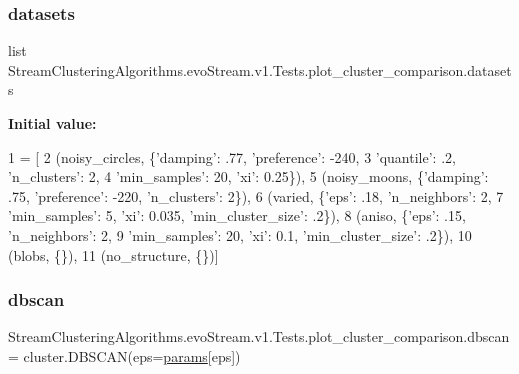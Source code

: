 \subsubsection{\texorpdfstring{datasets}{datasets}}
{\footnotesize\ttfamily list Stream\+Clustering\+Algorithms.\+evo\+Stream.\+v1.\+Tests.\+plot\+\_\+cluster\+\_\+comparison.\+datasets}

{\bfseries Initial value\+:}
\begin{DoxyCode}
1 =  [
2     (noisy\_circles, \{\textcolor{stringliteral}{'damping'}: .77, \textcolor{stringliteral}{'preference'}: -240,
3                      \textcolor{stringliteral}{'quantile'}: .2, \textcolor{stringliteral}{'n\_clusters'}: 2,
4                      \textcolor{stringliteral}{'min\_samples'}: 20, \textcolor{stringliteral}{'xi'}: 0.25\}),
5     (noisy\_moons, \{\textcolor{stringliteral}{'damping'}: .75, \textcolor{stringliteral}{'preference'}: -220, \textcolor{stringliteral}{'n\_clusters'}: 2\}),
6     (varied, \{\textcolor{stringliteral}{'eps'}: .18, \textcolor{stringliteral}{'n\_neighbors'}: 2,
7               \textcolor{stringliteral}{'min\_samples'}: 5, \textcolor{stringliteral}{'xi'}: 0.035, \textcolor{stringliteral}{'min\_cluster\_size'}: .2\}),
8     (aniso, \{\textcolor{stringliteral}{'eps'}: .15, \textcolor{stringliteral}{'n\_neighbors'}: 2,
9              \textcolor{stringliteral}{'min\_samples'}: 20, \textcolor{stringliteral}{'xi'}: 0.1, \textcolor{stringliteral}{'min\_cluster\_size'}: .2\}),
10     (blobs, \{\}),
11     (no\_structure, \{\})]
\end{DoxyCode}
\mbox{\label{namespaceStreamClusteringAlgorithms_1_1evoStream_1_1v1_1_1Tests_1_1plot__cluster__comparison_a6cb0df1eaf8a3f9e38336949b597d31a}} 
\subsubsection{\texorpdfstring{dbscan}{dbscan}}
{\footnotesize\ttfamily Stream\+Clustering\+Algorithms.\+evo\+Stream.\+v1.\+Tests.\+plot\+\_\+cluster\+\_\+comparison.\+dbscan = cluster.\+D\+B\+S\+C\+AN(eps=\hyperlink{namespaceStreamClusteringAlgorithms_1_1evoStream_1_1v1_1_1Tests_1_1plot__cluster__comparison_a57eaaa643ce4ca6f93e037fd8a49db07}{params}\mbox{[}\textquotesingle{}eps\textquotesingle{}\mbox{]})}

